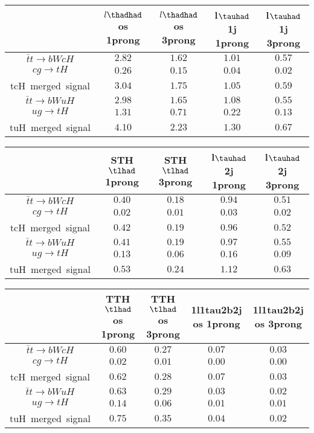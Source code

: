 \centering
\begin{tabular}{|c|c|c|c|c|} \hline
 & $l\thadhad$ os 1prong   & $l\thadhad$ os 3prong   & l$\tauhad$ 1j 1prong   & l$\tauhad$ 1j 3prong  \\\hline
$\bar{t}t\to bWcH$ & $2.82$ & $1.62$ & $1.01$ & $0.57$\\\hline
$cg\to tH$ & $0.26$ & $0.15$ & $0.04$ & $0.02$\\\hline
tcH~merged~signal & $3.04$ & $1.75$ & $1.05$ & $0.59$\\\hline
$\bar{t}t\to bWuH$ & $2.98$ & $1.65$ & $1.08$ & $0.55$\\\hline
$ug\to tH$ & $1.31$ & $0.71$ & $0.22$ & $0.13$\\\hline
tuH~merged~signal & $4.10$ & $2.23$ & $1.30$ & $0.67$\\\hline
\end{tabular}
\begin{tabular}{|c|c|c|c|c|} \hline
 & STH $\tlhad$  1prong   & STH $\tlhad$  3prong   & l$\tauhad$ 2j 1prong   & l$\tauhad$ 2j 3prong  \\\hline
$\bar{t}t\to bWcH$ & $0.40$ & $0.18$ & $0.94$ & $0.51$\\\hline
$cg\to tH$ & $0.02$ & $0.01$ & $0.03$ & $0.02$\\\hline
tcH~merged~signal & $0.42$ & $0.19$ & $0.96$ & $0.52$\\\hline
$\bar{t}t\to bWuH$ & $0.41$ & $0.19$ & $0.97$ & $0.55$\\\hline
$ug\to tH$ & $0.13$ & $0.06$ & $0.16$ & $0.09$\\\hline
tuH~merged~signal & $0.53$ & $0.24$ & $1.12$ & $0.63$\\\hline
\end{tabular}
\begin{tabular}{|c|c|c|c|c|} \hline
 & TTH $\tlhad$ os 1prong   & TTH $\tlhad$ os 3prong   & 1l1tau2b2j os 1prong   & 1l1tau2b2j os 3prong  \\\hline
$\bar{t}t\to bWcH$ & $0.60$ & $0.27$ & $0.07$ & $0.03$\\\hline
$cg\to tH$ & $0.02$ & $0.01$ & $0.00$ & $0.00$\\\hline
tcH~merged~signal & $0.62$ & $0.28$ & $0.07$ & $0.03$\\\hline
$\bar{t}t\to bWuH$ & $0.63$ & $0.29$ & $0.03$ & $0.02$\\\hline
$ug\to tH$ & $0.14$ & $0.06$ & $0.01$ & $0.01$\\\hline
tuH~merged~signal & $0.75$ & $0.35$ & $0.04$ & $0.02$\\\hline
\end{tabular}
